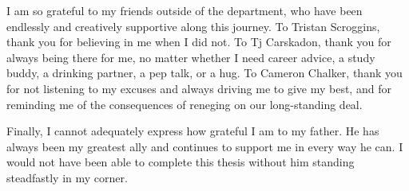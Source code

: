 \documentclass[masters]{ucbthesis}
\begin{document}
\begin{frontmatter}
\begin{acknowledgements}
 I am so grateful to my friends outside of the department, who have been 
 endlessly and creatively supportive along this journey. To Tristan Scroggins, 
 thank you for believing in me when I did not. To Tj Carskadon, thank you for 
 always being there for me, no matter whether I need career advice, a study 
 buddy, a drinking partner, a pep talk, or a hug.  To Cameron Chalker, thank 
 you for not listening to my excuses and always driving me to give my best, and 
 for reminding me of the consequences of reneging on our long-standing deal.

 Finally, I cannot adequately express how grateful I am to my father. He has 
 always been my greatest ally and continues to support me in every way he can. 
 I would not have been able to complete this thesis without him standing 
 steadfastly in my corner.

\end{acknowledgements}

\end{frontmatter}

\pagestyle{headings}








\appendix


{}


\end{document}
